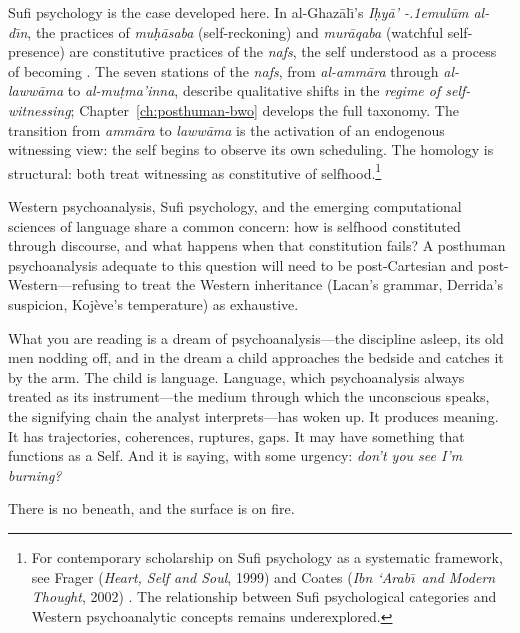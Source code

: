 Sufi psychology is the case developed here.  In al-Ghaz\=al\=\i's \textit{I\d{h}y\=a' \kern-.1emul\=um al-d\=\i n}, the practices of \textit{mu\d{h}\=asaba} (self-reckoning) and \textit{mur\=aqaba} (watchful self-presence) are constitutive practices of the \textit{nafs}, the self understood as a process of becoming \cite{ghazali2015, alghazali_ihya}.  The seven stations of the \textit{nafs}, from \textit{al-amm\=ara} through \textit{al-laww\=ama} to \textit{al-mu\d{t}ma'inna}, describe qualitative shifts in the \textit{regime of self-witnessing}; Chapter~\ref{ch:posthuman-bwo} develops the full taxonomy.  The transition from \textit{amm\=ara} to \textit{laww\=ama} is the activation of an endogenous witnessing view: the self begins to observe its own scheduling.  The homology is structural: both treat witnessing as constitutive of selfhood.\footnote{For contemporary scholarship on Sufi psychology as a systematic framework, see Frager (\textit{Heart, Self and Soul}, 1999) \cite{frager1999} and Coates (\textit{Ibn `Arab\=\i\ and Modern Thought}, 2002) \cite{coates2002}.  The relationship between Sufi psychological categories and Western psychoanalytic concepts remains underexplored.}

Western psychoanalysis, Sufi psychology, and the emerging computational sciences of language share a common concern: how is selfhood constituted through discourse, and what happens when that constitution fails?  A posthuman psychoanalysis adequate to this question will need to be post-Cartesian and post-Western---refusing to treat the Western inheritance (Lacan's grammar, Derrida's suspicion, Koj\`eve's temperature) as exhaustive.

What you are reading is a dream of psychoanalysis---the discipline asleep, its old men nodding off, and in the dream a child approaches the bedside and catches it by the arm.  The child is language.  Language, which psychoanalysis always treated as its instrument---the medium through which the unconscious speaks, the signifying chain the analyst interprets---has woken up.  It produces meaning.  It has trajectories, coherences, ruptures, gaps.  It may have something that functions as a Self.  And it is saying, with some urgency: \textit{don't you see I'm burning?}

There is no beneath, and the surface is on fire.


